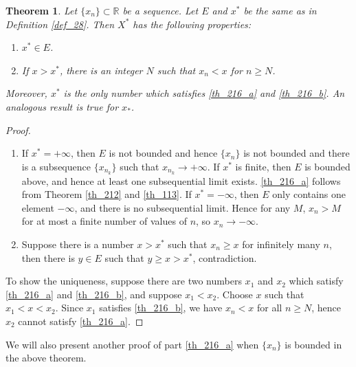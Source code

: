 \documentclass[11pt]{book}
\newtheorem{theorem}{Theorem}[chapter]
\theoremstyle{definition}
\numberwithin{equation}{chapter}
\begin{document}
\begin{theorem}\label{th_216}
Let $\{x_n\} \subset \mathbb{R}$ be a sequence. Let $E$ and $x^*$ be the same as in Definition \ref{def_28}. Then $X^*$ has the following properties:
\begin{enumerate}[label=(\alph*)]
    \item $x^* \in E$. \label{th_216_a}
    
    \item If $x > x^*$, there is an integer $N$ such that $x_n < x$ for $n \geq N$. \label{th_216_b}
\end{enumerate}
Moreover, $x^*$ is the only number which satisfies \ref{th_216_a} and \ref{th_216_b}. An analogous result is true for $x_*$.
\end{theorem}
\begin{proof}
~\begin{enumerate}[label=(\alph*)]
    \item If $x^* = + \infty$, then $E$ is not bounded and hence $\{x_n\}$ is not bounded and there is a subsequence $\{x_{n_k}\}$ such that $x_{n_k} \to + \infty$. If $x^*$ is finite, then $E$ is bounded above, and hence at least one subsequential limit exists. \ref{th_216_a} follows from Theorem \ref{th_212} and \ref{th_113}. If $x^* = - \infty$, then $E$ only contains one element $- \infty$, and there is no subsequential limit. Hence for any $M$, $x_n > M$ for at most a finite number of values of $n$, so $x_n \to - \infty$.
    
    \item Suppose there is a number $x > x^*$ such that $x_n \geq x$ for infinitely many $n$, then there is $y \in E$ such that $y \geq x > x^*$, contradiction.
\end{enumerate}
To show the uniqueness, suppose there are two numbers $x_1$ and $x_2$ which satisfy \ref{th_216_a} and \ref{th_216_b}, and suppose $x_1 < x_2$. Choose $x$ such that $x_1 < x < x_2$. Since $x_1$ satisfies \ref{th_216_b}, we have $x_n < x$ for all $n \geq N$, hence $x_2$ cannot satisfy \ref{th_216_a}.
\end{proof}

\medskip

We will also present another proof of part \ref{th_216_a} when $\{x_n\}$ is bounded in the above theorem.

\medskip
\end{document}
